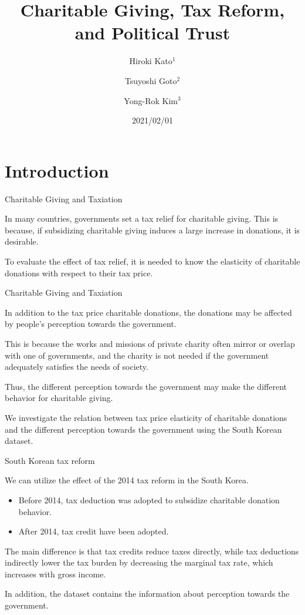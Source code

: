 \documentclass[
  ignorenonframetext,
]{beamer}
\title{Charitable Giving, Tax Reform, and Political Trust}
\author{Hiroki Kato\(^1\) \and Tsuyoshi Goto\(^2\) \and Yong-Rok Kim\(^3\)}
\date{2021/02/01}
\institute{\(^1\)Osaka University \and \(^2\)Chiba University \and \(^3\)Kobe University}
\providecommand{\tightlist}{%
  \setlength{\itemsep}{0pt}\setlength{\parskip}{0pt}}
\begin{document}
\frame{\titlepage}

\hypertarget{introduction}{%
\section{Introduction}\label{introduction}}

\begin{frame}{Charitable Giving and Taxiation}
\protect\hypertarget{charitable-giving-and-taxiation}{}

In many countries, governments set a tax relief for charitable giving.
This is because, if subsidizing charitable giving induces a large
increase in donations, it is desirable.

To evaluate the effect of tax relief, it is needed to know the
elasticity of charitable donations with respect to their tax price.

\end{frame}

\begin{frame}{Charitable Giving and Taxiation}
\protect\hypertarget{charitable-giving-and-taxiation-1}{}

In addition to the tax price charitable donations, the donations may be
affected by people's perception towards the government.

This is because the works and missions of private charity often mirror
or overlap with one of governments, and the charity is not needed if the
government adequately satisfies the needs of society.

Thus, the different perception towards the government may make the
different behavior for charitable giving.

We investigate the relation between tax price elasticity of charitable
donations and the different perception towards the government using the
South Korean dataset.

\end{frame}

\begin{frame}{South Korean tax reform}
\protect\hypertarget{south-korean-tax-reform}{}

We can utilize the effect of the 2014 tax reform in the South Korea.

\begin{itemize}
\tightlist
\item
  Before 2014, tax deduction was adopted to subsidize charitable
  donation behavior.
\item
  After 2014, tax credit have been adopted.
\end{itemize}

The main difference is that tax credits reduce taxes directly, while tax
deductions indirectly lower the tax burden by decreasing the marginal
tax rate, which increases with gross income.

In addition, the dataset contains the information about perception
towards the government.

\end{frame}
\end{document}
